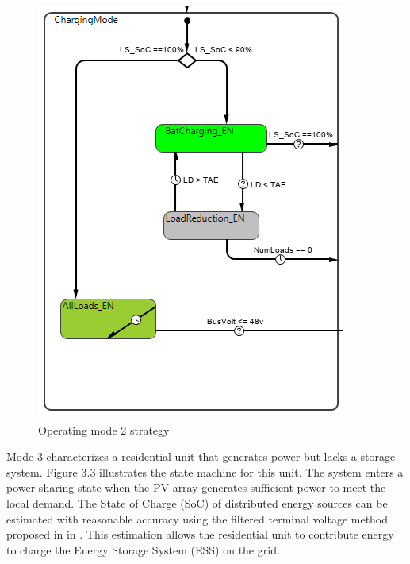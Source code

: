 \begin{figure}[H]
	\centering
	\includegraphics[totalheight=12cm]{Figures/opmod2 strategy.png}
	\caption{Operating mode 2 strategy}
\end{figure}
Mode 3 characterizes a residential unit that generates power but lacks a storage system. Figure 3.3 illustrates the state machine for this unit. The system enters a power-sharing state when the PV array generates sufficient power to meet the local demand. The State of Charge (SoC) of distributed energy sources can be estimated with reasonable accuracy using the filtered terminal voltage method proposed in in \cite{40}. This estimation allows the residential unit to contribute energy to charge the Energy Storage System (ESS) on the grid.\par
